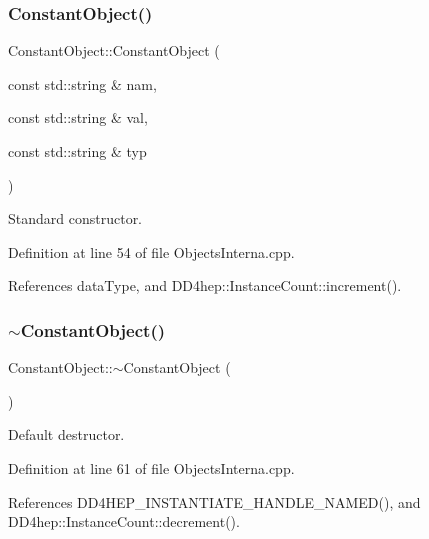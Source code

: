 \subsubsection{\texorpdfstring{Constant\+Object()}{ConstantObject()}\hspace{0.1cm}{\footnotesize\ttfamily [1/2]}}
{\footnotesize\ttfamily Constant\+Object\+::\+Constant\+Object (\begin{DoxyParamCaption}\item[{const std\+::string \&}]{nam,  }\item[{const std\+::string \&}]{val,  }\item[{const std\+::string \&}]{typ }\end{DoxyParamCaption})}



Standard constructor. 



Definition at line 54 of file Objects\+Interna.\+cpp.



References data\+Type, and D\+D4hep\+::\+Instance\+Count\+::increment().

\hypertarget{class_d_d4hep_1_1_geometry_1_1_constant_object_af524dd1ddcc810be603b62808042d0cb}{}\label{class_d_d4hep_1_1_geometry_1_1_constant_object_af524dd1ddcc810be603b62808042d0cb} 
\subsubsection{\texorpdfstring{$\sim$\+Constant\+Object()}{~ConstantObject()}}
{\footnotesize\ttfamily Constant\+Object\+::$\sim$\+Constant\+Object (\begin{DoxyParamCaption}{ }\end{DoxyParamCaption})\hspace{0.3cm}{\ttfamily [virtual]}}



Default destructor. 



Definition at line 61 of file Objects\+Interna.\+cpp.



References D\+D4\+H\+E\+P\+\_\+\+I\+N\+S\+T\+A\+N\+T\+I\+A\+T\+E\+\_\+\+H\+A\+N\+D\+L\+E\+\_\+\+N\+A\+M\+E\+D(), and D\+D4hep\+::\+Instance\+Count\+::decrement().

